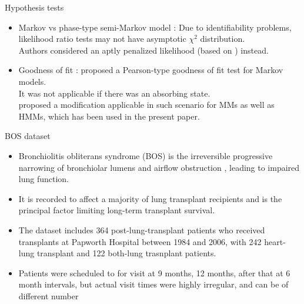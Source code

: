 \documentclass{beamer}
\begin{document}
\begin{frame}{Hypothesis tests}
\begin{itemize}
\item Markov vs phase-type semi-Markov model : Due to identifiability problems, likelihood ratio tests may not have asymptotic $\chi^2$ distribution. \\ \vspace{2mm} Authors considered an aptly penalized likelihood (based on \cite{chen2001modified}) instead.

\item Goodness of fit : \cite{aguirre2002pearson} proposed a Pearson-type goodness of fit test for Markov models.\\  \vspace{2mm} It was not applicable if there was an absorbing state. \\  \vspace{2mm}\cite{titman2008general} proposed a modification applicable in such scenario for MMs as well as HMMs, which has been used in the present paper.
\end{itemize}
\end{frame}

\begin{frame}{BOS dataset}
\begin{itemize}
\item Bronchiolitis obliterans syndrome (BOS) is the irreversible progressive narrowing of bronchiolar lumens and airflow obstruction \citep{todd2011bronchiolitis}, leading to impaired lung function.
\item It is recorded to affect a majority of lung transplant recipients and is the principal factor limiting long-term transplant survival.
\item The dataset includes 364 post-lung-transplant patients who received transplants at Papworth Hospital between 1984 and 2006, with 242 heart-lung transplant and 122 both-lung trasnplant patients. 
\item Patients were scheduled to for visit at 9 months, 12 months, after that at 6 month intervals, but actual visit times were highly irregular, and can be of different number
\end{itemize}
\end{frame}
\end{document}
